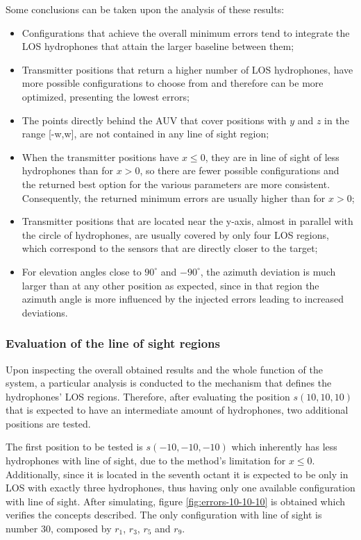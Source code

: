 Some conclusions can be taken upon the analysis of these results: 
\begin{itemize}
	\item Configurations that achieve the overall minimum errors tend to integrate the LOS hydrophones that attain the larger baseline between them;
	
	\item Transmitter positions that return a higher number of LOS hydrophones, have more possible configurations to choose from and therefore can be more optimized, presenting the lowest errors;
	
	\item The points directly behind the AUV that cover positions with $y$ and $z$ in the range [-w,w], are not contained in any line of sight region;
	
	\item When the transmitter positions have $x \leq 0$, they are in line of sight of less hydrophones than for $x > 0$, so there are fewer possible configurations and the returned best option for the various parameters are more consistent. Consequently, the returned minimum errors are usually higher than for $x > 0$;
	
	\item Transmitter positions that are located near the y-axis, almost in parallel with the circle of hydrophones, are usually covered by only four LOS regions, which correspond to the sensors that are directly closer to the target;
	
	\item For elevation angles close to $90^{\circ}$ and $-90^{\circ}$, the azimuth deviation is much larger than at any other position as expected, since in that region the azimuth angle is more influenced by the injected errors leading to increased deviations.
\end{itemize}

\subsubsection{ Evaluation of the line of sight regions}	

Upon inspecting the overall obtained results and the whole function of the system, a particular analysis is conducted to the mechanism that defines the hydrophones' LOS regions. Therefore, after evaluating the position $s(10,10,10)$ that is expected to have an intermediate amount of hydrophones, two additional positions are tested.

The first position to be tested is $s(-10,-10,-10)$ which inherently has less hydrophones with line of sight, due to the method's limitation for $x \leq 0$. Additionally, since it is located in the seventh octant it is expected to be only in LOS with exactly three hydrophones, thus having only one available configuration with line of sight. After simulating, figure \ref{fig:errors-10-10-10} is obtained which verifies the concepts described. The only configuration with line of sight is number 30, composed by $r_1$, $r_3$, $r_5$ and $r_9$.

